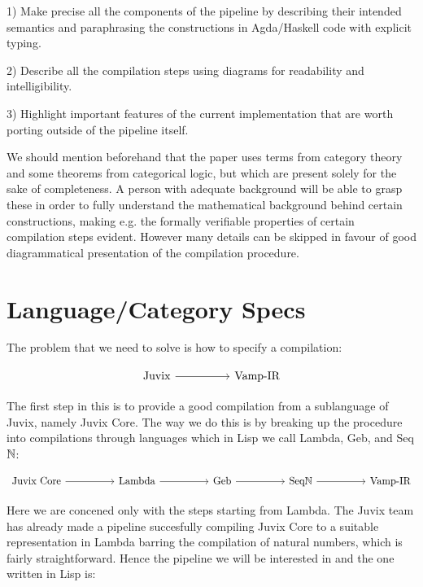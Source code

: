 1) Make precise all the components of the pipeline by describing their intended semantics and paraphrasing the constructions in Agda/Haskell code with explicit typing.

2) Describe all the compilation steps using diagrams for readability and intelligibility.

3) Highlight important features of the current implementation that are worth porting outside of the pipeline itself.

We should mention beforehand that the paper uses terms from category theory and some theorems from categorical logic, but which are present solely for the sake of completeness. A person with adequate background will be able to grasp these in order to fully understand the mathematical background behind certain constructions, making e.g. the formally verifiable properties of certain compilation steps evident. However many details can be skipped in favour of good diagrammatical presentation of the compilation procedure.

\section{Language/Category Specs}

The problem that we need to solve is how to specify a compilation:

\[\begin{tikzcd}
	{\text{Juvix} } && {\text{Vamp-IR}}
	\arrow[from=1-1, to=1-3]
\end{tikzcd}\]

The first step in this is to provide a good compilation from a sublanguage of Juvix, namely Juvix Core. The way we do this is by breaking up the procedure into compilations through languages which in Lisp we call Lambda, Geb, and Seq$\mathbb{N}$:

\[\begin{tikzcd}
	{\text{Juvix Core}} && {\text{Lambda}} && {\text{Geb}} && {\text{Seq$\N$} } && {\text{Vamp-IR}}
	\arrow[from=1-3, to=1-5]
	\arrow[from=1-5, to=1-7]
	\arrow[from=1-7, to=1-9]
	\arrow[from=1-1, to=1-3]
\end{tikzcd}\]

Here we are concened only with the steps starting from Lambda. The Juvix team has already made a pipeline succesfully compiling Juvix Core to a suitable representation in Lambda barring the compilation of natural numbers, which is fairly straightforward. Hence the pipeline we will be interested in and the one written in Lisp is:

